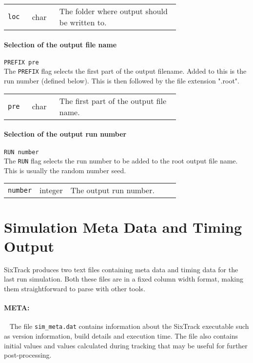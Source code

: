 \bigskip
\begin{tabular}{@{}llp{0.7\linewidth}}
    \texttt{loc} & char    & The folder where output should be written to.
\end{tabular}

\bigskip
\paragraph{Selection of the output file name} \texttt{PREFIX pre}\\

The \texttt{PREFIX} flag selects the first part of the output filename.
Added to this is the run number (defined below).
This is then followed by the file extension ".root".

\bigskip
\begin{tabular}{@{}llp{0.7\linewidth}}
    \texttt{pre} & char    & The first part of the output file name.
\end{tabular}

\bigskip
\paragraph{Selection of the output run number} \texttt{RUN number}\\

The \texttt{RUN} flag selects the run number to be added to the root output file name. 
This is usually the random number seed.

\bigskip
\begin{tabular}{@{}llp{0.7\linewidth}}
    \texttt{number} & integer    & The output run number.
\end{tabular}

\section{Simulation Meta Data and Timing Output} \label{sec:METATIME}

SixTrack produces two text files containing meta data and timing data for the last run simulation.
Both these files are in a fixed column width format, making them straightforward to parse with other tools.

\paragraph{META:}~
The file \texttt{sim\_meta.dat} contains information about the SixTrack executable such as version information, build details and execution time.
The file also contains initial values and values calculated during tracking that may be useful for further post-processing.

